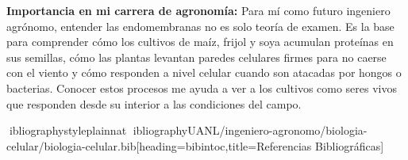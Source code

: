 \documentclass[spanish,letterpaper,oneside]{article}
\begin{document}
\textbf{Importancia en mi carrera de agronomía:} Para mí como futuro ingeniero agrónomo, entender las endomembranas no es solo teoría de examen. Es la base para comprender cómo los cultivos de maíz, frijol y soya acumulan proteínas en sus semillas, cómo las plantas levantan paredes celulares firmes para no caerse con el viento y cómo responden a nivel celular cuando son atacadas por hongos o bacterias. Conocer estos procesos me ayuda a ver a los cultivos como seres vivos que responden desde su interior a las condiciones del campo.

\vspace{0.6cm}
ibliographystyle{plainnat}
ibliography{UANL/ingeniero-agronomo/biologia-celular/biologia-celular.bib}[heading=bibintoc,title={Referencias Bibliográficas}]
\end{document}
